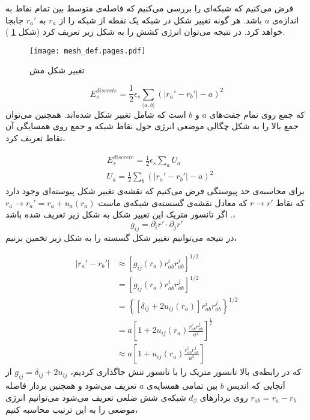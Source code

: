 فرض می‌کنیم که شبکه‌ای را بررسی می‌کنیم که فاصله‌ی متوسط بین تمام نقاط به اندازه‌ی $a$ باشد. هر گونه تغییر شکل در شبکه یک نقطه از شبکه را از $r_a$ به $r_a'$ جابجا خواهد کرد. در نتیجه می‌توان انرژی کشش را به شکل زیر تعریف کرد (شکل
\ref{fig:mesh_def}
).
\begin{figure}[h]
\begin{center}
\texttt{[image: mesh\_def.pages.pdf]}
\caption{
تغییر شکل مش
}
\label{fig:mesh_def}
\end{center}
\end{figure}

\begin{equation}
E_s^{discrete}=\frac{1}{2}\epsilon_s\sum_{\langle a,b\rangle}\left(|r_a'-r_b'|-a\right)^2
\label{eq:stretchdiscrete}
\end{equation}
که جمع روی تمام جفت‌های $a$ و $b$ است که شامل تغییر شکل شده‌اند.  همچنین می‌توان جمع بالا را به شکل چگالی موضعی انرژی حول نقاط شبکه و جمع روی همسایگی‌ آن نقاط تعریف کرد،

\begin{equation}
\begin{aligned}
&E_s^{discrete}=\frac{1}{2}\epsilon_s\sum_aU_a\\
&U_a=\frac{1}{2}\sum_b\left(|r_a'-r_b'|-a\right)^2
\end{aligned}
\end{equation}
برای محاسبه‌ی حد پیوستگی فرض می‌کنیم که نقشه‌‌ی تغییر شکل پیوسته‌ای وجود دارد که نقاط 
$r\rightarrow r'$
که معادل نقشه‌ی گسسته‌ی شبکه‌ی ماست
$r_a\rightarrow r_a'=r_a+u_a(r_a)$
. اگر تانسور متریک این تغییر شکل به شکل زیر تعریف شده باشد،
\begin{equation}
g_{ij}=\partial_i r'\cdot\partial_jr'
\end{equation}
در نتیجه می‌توانیم تغییر شکل گسسته را به شکل زیر تخمین بزنیم،

\begin{equation}
\begin{aligned}
|r_a'-r_b'|&\approx \left[g_{ij}(r_a)r_{ab}^ir_{ab}^j\right]^{1/2}\\
&= \left[g_{ij}(r_a)r_{ab}^ir_{ab}^j\right]^{1/2}\\
&= \left\{\left[\delta_{ij}+2u_{ij}(r_a)\right]r_{ab}^ir_{ab}^j\right\}^{1/2}\\
&= a\left[1+2u_{ij}(r_a)\frac{r_{ab}^ir_{ab}^j}{a^2}\right]^\frac{1}{2}\\
&\approx a\left[1+u_{ij}(r_a)\frac{r_{ab}^ir_{ab}^j}{a^2}\right]
\label{eq:gstrain1}
\end{aligned}
\end{equation}
که در رابطه‌ی بالا تانسور متریک را با تانسور تنش جاگذاری کردیم،
$g_{ij}=\delta_{ij}+2u_{ij}$
از آنجایی که اندیس $b$ بین تمامی همسایه‌ی $a$ تعریف می‌شود و همچنین بردار فاصله‌
$r_{ab}=r_a-r_b$
روی بردار‌های
$d_\beta$
 شبکه‌ی شش ضلعی تعریف می‌شود می‌توانیم انرژی موضعی را به این ترتیب محاسبه‌ کنیم،

